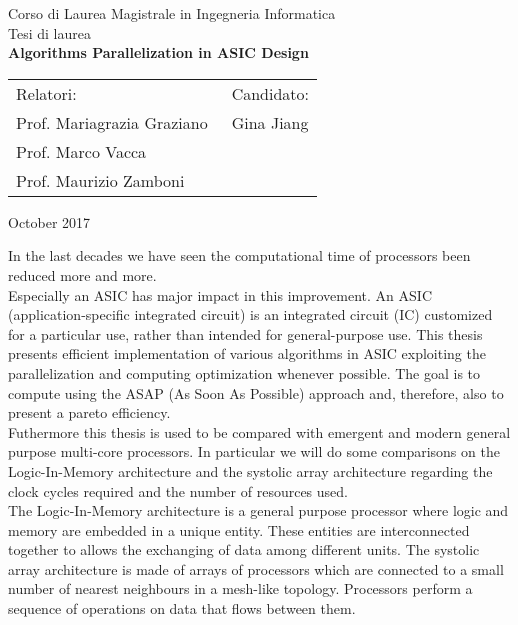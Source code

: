 \documentclass[12pt]{report}
\begin{document}
	\pagestyle{empty}
	\begin{center}
		
		Corso di Laurea Magistrale in Ingegneria Informatica\\ %
		\vspace{1cm}
		{\large Tesi di laurea}\\
		\vspace{1cm}
		{\Large \textbf{Algorithms Parallelization in ASIC Design}}\\ %
	\end{center}
	\vspace{1cm}
	\begin{tabular}{l l}
		Relatori:  &  Candidato: \\ %
		Prof. Mariagrazia Graziano \hspace{6 cm}$\,$ & Gina Jiang \\
		Prof. Marco Vacca \\
		Prof. Maurizio Zamboni
		
	\end{tabular}
	\vspace{1cm}
	\begin{center}
		October 2017 \\ %
	\end{center}
	\vspace{1cm}
	
	In the last decades we have seen the computational time of processors been reduced more and more.\\
	Especially an ASIC has major impact in this improvement. An ASIC (application-specific integrated circuit) is an integrated circuit (IC) customized for a particular use, rather than intended for general-purpose use.
	This thesis presents efficient implementation of various algorithms in ASIC exploiting the parallelization and computing optimization whenever possible. The goal is to compute using the ASAP (As Soon As Possible) approach and, therefore, also to present a pareto efficiency. \\
	
	Futhermore this thesis is used to be compared with emergent and modern general purpose multi-core processors.
	In particular we will do some comparisons on the Logic-In-Memory architecture and the systolic array architecture regarding the clock cycles required and the number of resources used.\\
	The Logic-In-Memory architecture is a general purpose processor where logic and memory are embedded in a unique entity. These entities are interconnected together to allows the exchanging of data among different units.
	The systolic array architecture is made of arrays of processors which are connected to a small number of nearest neighbours in a mesh-like topology. Processors perform a sequence of operations on data that flows between them.
	
\end{document}
